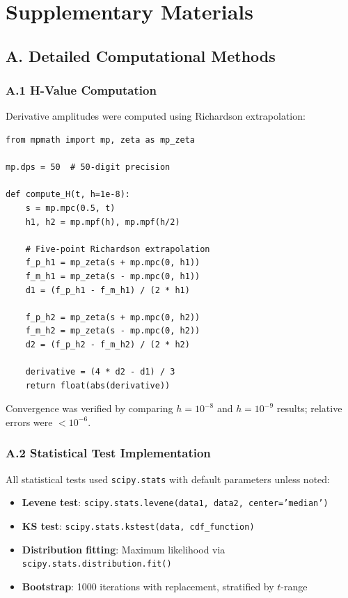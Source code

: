 \documentclass[12pt]{article}
\begin{document}
\newpage

\section*{Supplementary Materials}

\subsection*{A. Detailed Computational Methods}

\subsubsection*{A.1 H-Value Computation}

Derivative amplitudes were computed using Richardson extrapolation:

\begin{verbatim}
from mpmath import mp, zeta as mp_zeta

mp.dps = 50  # 50-digit precision

def compute_H(t, h=1e-8):
    s = mp.mpc(0.5, t)
    h1, h2 = mp.mpf(h), mp.mpf(h/2)
    
    # Five-point Richardson extrapolation
    f_p_h1 = mp_zeta(s + mp.mpc(0, h1))
    f_m_h1 = mp_zeta(s - mp.mpc(0, h1))
    d1 = (f_p_h1 - f_m_h1) / (2 * h1)
    
    f_p_h2 = mp_zeta(s + mp.mpc(0, h2))
    f_m_h2 = mp_zeta(s - mp.mpc(0, h2))
    d2 = (f_p_h2 - f_m_h2) / (2 * h2)
    
    derivative = (4 * d2 - d1) / 3
    return float(abs(derivative))
\end{verbatim}

Convergence was verified by comparing $h = 10^{-8}$ and $h = 10^{-9}$ results; relative errors were $< 10^{-6}$.

\subsubsection*{A.2 Statistical Test Implementation}

All statistical tests used \texttt{scipy.stats} with default parameters unless noted:
\begin{itemize}
\item \textbf{Levene test}: \texttt{scipy.stats.levene(data1, data2, center='median')}
\item \textbf{KS test}: \texttt{scipy.stats.kstest(data, cdf\_function)}
\item \textbf{Distribution fitting}: Maximum likelihood via \texttt{scipy.stats.distribution.fit()}
\item \textbf{Bootstrap}: 1000 iterations with replacement, stratified by $t$-range
\end{itemize}
\end{document}
